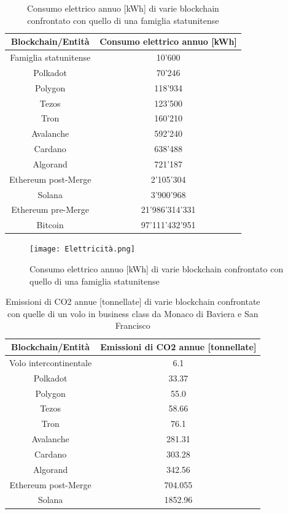 \documentclass[12pt]{report}
\begin{document}
\begin{table}[H]
\centering
\begin{tabular}{|c|c|}
\hline
\textbf{Blockchain/Entità} & \textbf{Consumo elettrico annuo [kWh]} \\
\hline
Famiglia statunitense & 10'600 \\
\hline
Polkadot & 70'246 \\
\hline
Polygon & 118'934 \\
\hline
Tezos & 123'500 \\
\hline
Tron & 160'210 \\
\hline
Avalanche & 592'240 \\
\hline
Cardano & 638'488 \\
\hline
Algorand & 721'187 \\
\hline
Ethereum post-Merge & 2'105'304 \\
\hline
Solana & 3'900'968 \\
\hline
Ethereum pre-Merge & 21'986'314'331 \\
\hline
Bitcoin & 97'111'432'951 \\
\hline
\end{tabular}
\captionsetup{justification=centering}
\caption{Consumo elettrico annuo [kWh] di varie blockchain confrontato con quello di una famiglia statunitense \cite{Tredici}}
\label{tab:elettricità}
\end{table}

\begin{figure}[H]
    \centering
    \texttt{[image: Elettricità.png]}
    \captionsetup{justification=centering}
    \caption{Consumo elettrico annuo [kWh] di varie blockchain confrontato con quello di una famiglia statunitense \cite{Tredici}}
    \label{fig:elettricità}
\end{figure}

\begin{table}[H]
\centering
\begin{tabular}{|c|c|}
\hline
\textbf{Blockchain/Entità} & \textbf{Emissioni di CO2 annue [tonnellate]} \\
\hline
Volo intercontinentale & 6.1 \\
\hline
Polkadot & 33.37 \\
\hline
Polygon & 55.0 \\
\hline
Tezos & 58.66 \\
\hline
Tron & 76.1 \\
\hline
Avalanche & 281.31 \\
\hline
Cardano & 303.28 \\
\hline
Algorand & 342.56 \\
\hline
Ethereum post-Merge & 704.055 \\
\hline
Solana & 1852.96 \\
\hline
\end{tabular}
\captionsetup{justification=centering}
\caption{Emissioni di CO2 annue [tonnellate] di varie blockchain confrontate con quelle di un volo in business class da Monaco di Baviera e San Francisco \cite{Tredici}}
\label{tab:CO2}
\end{table}
\end{document}
